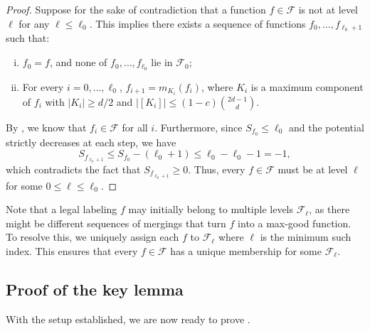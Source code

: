 \documentclass{amsart}
\theoremstyle{definition}
\newcommand{\cF}{\mathcal{F} }
\newcommand{\0}[0]{\emptyset}
\begin{document}
\begin{proof}
Suppose for the sake of contradiction that a function $f \in \mathcal{F}$ is not at level $\ell$ for any $\ell \leq \ell_0$. This implies there exists a sequence of functions $f_0, \dots, f_{\ell_0+1}$ such that:
\begin{enumerate}[(i)]
    \item $f_0 = f$, and none of $f_0, \dots, f_{\ell_0}$ lie in $\mathcal{F}_0$;
    \item For every $i = 0, \dots, \ell_0$, $f_{i+1} = m_{K_i}(f_i)$, where $K_i$ is a maximum component of $f_i$ with $|K_i|\geq d/2$ and $|[K_i]|\leq (1-c)\binom{2d-1}{d}$.
\end{enumerate}
By , we know that $f_i \in \mathcal{F}$ for all $i$. Furthermore, since $S_{f_0} \leq \ell_0$ and the potential strictly decreases at each step, we have
$$S_{f_{\ell_0+1}} \leq S_{f_0} - (\ell_0 + 1) \leq \ell_0 - \ell_0 - 1 = -1,$$
which contradicts the fact that $S_{f_{\ell_0+1}} \geq 0$. Thus, every $f \in \mathcal{F}$ must be at level $\ell$ for some $0 \leq \ell \leq \ell_0$.
\end{proof}



Note that a legal labeling $f$ may initially belong to multiple levels $\cF_\ell$, as there might be different sequences of mergings that turn $f$ into a max-good function. To resolve this, we uniquely assign each $f$ to $\cF_\ell$ where $\ell$ is the minimum such index. This ensures that every $f \in \cF$ has a unique membership for some $\cF_\ell$.

\subsection{Proof of the key lemma} With the setup established, we are now ready to prove . 
\end{document}

